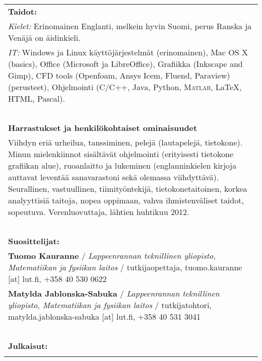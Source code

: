 \documentclass[a4paper]{article}
\begin{document}
\begin{longtable}{p{}}

\multicolumn{1}{l}{\cellcolor{myGray}\textbf{Taidot:}}\\\vspace{-5pt}

\emph{Kielet:} Erinomainen Englanti, melkein hyvin Suomi, perus Ranska ja
Ven\"aj\"a on \"aidinkieli.\\

\emph{IT:} Windows ja Linux k\"aytt\"oj\"arjestelm\"at (erinomainen), Mac OS X
  (basics), Office (Microsoft ja LibreOffice), Grafiikka (Inkscape and Gimp),
  CFD tools (Openfoam, Ansys Icem, Fluend, Paraview) (perusteet), Ohjelmointi
  (C/C++, Java, Python, \textsc{Matlab}, \LaTeX, HTML, Pascal).\\\ \\

\multicolumn{1}{l}{\cellcolor{myGray}\textbf{Harrastukset ja henkil\"okohtaiset
  ominaisuudet}}\\\vspace{-5pt}

  Viihdyn eri\"a urheilua, tanssiminen, pelej\"a (lautapelej\"a, tietokone).
  Minun mielenkiinnot sis\"alt\"av\"at ohjelmointi (erityisesti tietokone
  grafiikan alue), ruoanlaitto ja lukeminen (englanninkielen kirjoja auttavat
  levent\"a\"a sanavarastoni sek\"a olemassa viihdytt\"av\"a). Seurallinen,
  vastuullinen, tiimity\"ontekij\"a, tietokonetaitoinen, korkea analyyttisi\"a
  taitoja, nopea oppimaan, vahva ihmistenv\"aliset taidot, sopeutuva.
  Verenluovuttaja, l\"ahtien huhtikuu 2012.\\\ \\

\multicolumn{1}{l}{\cellcolor{myGray}\textbf{Suosittelijat:}}\\\vspace{-5pt}

\textbf{Tuomo Kauranne} / \textsl{Lappeenrannan teknillinen yliopisto,
  Matematiikan ja fysiikan laitos} / tutkijaopettaja, tuomo.kauranne [at]
  lut.fi, +358 40 530 0622\\
\textbf{Matylda Jablonska-Sabuka} / \textsl{Lappeenrannan teknillinen yliopisto,
  Matematiikan ja fysiikan laitos} / tutkijatohtori, matylda.jablonska-sabuka
  [at] lut.fi, +358 40 531 3041\\\ \\

\multicolumn{1}{l}{\cellcolor{myGray}\textbf{Julkaisut:}}\\\vspace{-15pt}

\nocite{Mar2:2008} \nocite{Mar:2008} \nocite{InvCamCal:2011}
\nocite{DetShaArt:2014} \nocite{ShaAreCal:2015}

\vspace{-30pt}

\renewcommand{\refname}{}



\end{longtable}
\end{document}
